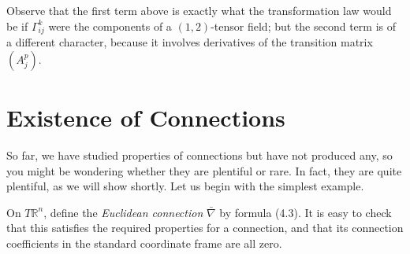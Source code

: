 Observe that the first term above is exactly what the transformation law would be if $\Gamma^k_{ij}$ were the components of a $(1,2)$-tensor field; but the second term is of a different character, because it involves derivatives of the transition matrix $(A^p_j)$.

\section{Existence of Connections}

So far, we have studied properties of connections but have not produced any, so you might be wondering whether they are plentiful or rare. In fact, they are quite plentiful, as we will show shortly. Let us begin with the simplest example.

\begin{example}
\label{ex:euclidean-connection}
On $T\mathbb{R}^n$, define the \emph{Euclidean connection} $\bar\nabla$ by formula (4.3). It is easy to check that this satisfies the required properties for a connection, and that its connection coefficients in the standard coordinate frame are all zero.
\end{example}

